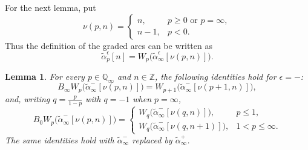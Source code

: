 \documentclass[11pt,a4paper,reqno]{amsart}%
\theoremstyle{plain}
\newtheorem{lemma}[lemma]{Lemma}
\theoremstyle{definition}
\numberwithin{equation}{section}
\numberwithin{equation}{section}
\def\ZZ{\mathbb{Z}}
\newcommand{\QQi}{\mathbb{Q}_\infty}
\begin{document}
For the next lemma, put
\[
\nu(p,n)=
\begin{cases}
n,& p\ge 0\text{ or }p=\infty,\\
n-1,& p<0.
\end{cases}
\]
Thus the definition of the graded arcs can be written as
\[
\widetilde{\alpha}_p^\epsilon[n]
=W_p\bigl(\widetilde{\alpha}_\infty^\epsilon[\nu(p,n)]\bigr).
\]

\begin{lemma}\label{lem:bt-normal-forms}
For every $p\in\QQi$ and $n\in\ZZ$, the following identities hold for
$\epsilon=-$:
\begin{equation}\label{eq:B-infty-normal-form}
B_\infty W_p\bigl(\widetilde{\alpha}_\infty^-[\nu(p,n)]\bigr)
=W_{p+1}\bigl(\widetilde{\alpha}_\infty^-[\nu(p+1,n)]\bigr),
\end{equation}
and, writing $q=\frac{p}{1-p}$ with $q=-1$ when $p=\infty$,
\begin{equation}\label{eq:B-zero-normal-form}
B_0W_p\bigl(\widetilde{\alpha}_\infty^-[\nu(p,n)]\bigr)
=
\begin{cases}
W_q\bigl(\widetilde{\alpha}_\infty^-[\nu(q,n)]\bigr),& p\le 1,\\[4pt]
W_q\bigl(\widetilde{\alpha}_\infty^-[\nu(q,n+1)]\bigr),& 1<p\le\infty.
\end{cases}
\end{equation}
The same identities hold with $\widetilde{\alpha}_\infty^-$ replaced by
$\widetilde{\alpha}_\infty^+$.
\end{lemma}
\end{document}
